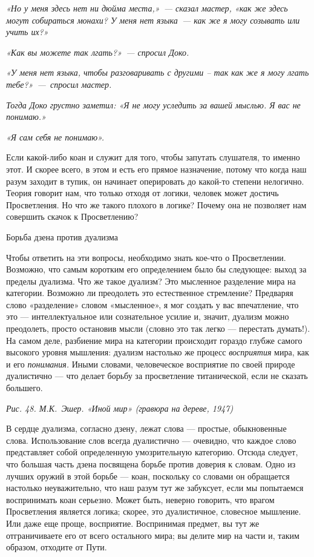 \documentclass[../main.tex]{subfiles}
\begin{document}
\emph{«Но у меня здесь нет ни дюйма места,»~--- сказал мастер, «как же здесь могут собираться монахи? У меня нет языка~--- как же я могу созывать или учить их?»}

\emph{«Как вы можете так лгать?»~--- спросил Доко.}

\emph{«У меня нет языка, чтобы разговаривать с другими \--- так как же я могу лгать тебе?»~---~спросил мастер.}

\emph{Тогда Доко грустно заметил: «Я не могу уследить за вашей мыслью. Я вас не понимаю.»}

\emph{«Я сам себя не понимаю».}

Если какой-либо коан и служит для того, чтобы запутать слушателя, то именно этот. И скорее всего, в этом и есть его прямое назначение, потому что когда наш разум заходит в тупик, он начинает оперировать до какой-то степени нелогично. Теория говорит нам, что только отходя от логики, человек может достичь Просветления. Но что же такого плохого в логике? Почему она не позволяет нам совершить скачок к Просветлению?

Борьба дзена против дуализма

Чтобы ответить на эти вопросы, необходимо знать кое-что о Просветлении. Возможно, что самым коротким его определением было бы следующее: выход за пределы дуализма. Что же такое дуализм? Это мысленное разделение мира на категории. Возможно ли преодолеть это естественное стремление? Предваряя слово «разделение» словом «мысленное», я мог создать у вас впечатление, что это --- интеллектуальное или сознательное усилие и, значит, дуализм можно преодолеть, просто остановив мысли (словно это так легко --- перестать думать!). На самом деле, разбиение мира на категории происходит гораздо глубже самого высокого уровня мышления: дуализм настолько же процесс \emph{восприятия} мира, как и его \emph{понимания.} Иными словами, человеческое восприятие по своей природе дуалистично --- что делает борьбу за просветление титанической, если не сказать большего.

\emph{Рис. 48. М.К.~Эшер. «Иной мир» (гравюра на дереве, 1947)}

В сердце дуализма, согласно дзену, лежат слова --- простые, обыкновенные слова. Использование слов всегда дуалистично --- очевидно, что каждое слово представляет собой определенную умозрительную категорию. Отсюда следует, что большая часть дзена посвящена борьбе против доверия к словам. Одно из лучших оружий в этой борьбе --- коан, поскольку со словами он обращается настолько неуважительно, что наш разум тут же забуксует, если мы попытаемся воспринимать коан серьезно. Может быть, неверно говорить, что врагом Просветления является логика; скорее, это дуалистичное, словесное мышление. Или даже еще проще, восприятие. Воспринимая предмет, вы тут же отграничиваете его от всего остального мира; вы делите мир на части и, таким образом, отходите от Пути.
\end{document}
